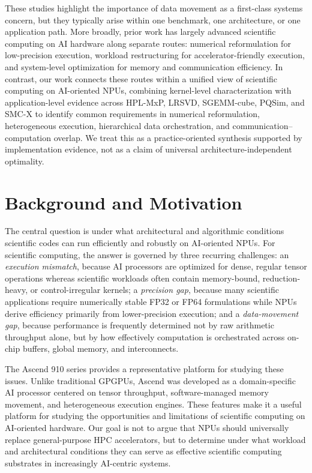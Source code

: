 \documentclass{article}
\newcommand{\rev}[1]{#1}
\begin{document}
These studies highlight the importance of data movement as a first-class systems concern, but they typically arise within one benchmark, one architecture, or one application path. More broadly, prior work has largely advanced scientific computing on AI hardware along separate routes: numerical reformulation for low-precision execution, workload restructuring for accelerator-friendly execution, and system-level optimization for memory and communication efficiency. In contrast, our work connects these routes within a unified view of scientific computing on AI-oriented NPUs, combining kernel-level characterization with application-level evidence across HPL-MxP, LRSVD, SGEMM-cube, PQSim, and SMC-X to identify common requirements in numerical reformulation, heterogeneous execution, hierarchical data orchestration, and communication--computation overlap. \rev{We treat this as a practice-oriented synthesis supported by implementation evidence, not as a claim of universal architecture-independent optimality.}


\section{Background and Motivation}

The central question is under what architectural and algorithmic conditions scientific codes can run efficiently and robustly on AI-oriented NPUs. For scientific computing, the answer is governed by three recurring challenges: an \emph{execution mismatch}, because AI processors are optimized for dense, regular tensor operations whereas scientific workloads often contain memory-bound, reduction-heavy, or control-irregular kernels; a \emph{precision gap}, because many scientific applications require numerically stable FP32 or FP64 formulations while NPUs derive efficiency primarily from lower-precision execution; and a \emph{data-movement gap}, because performance is frequently determined not by raw arithmetic throughput alone, but by how effectively computation is orchestrated across on-chip buffers, global memory, and interconnects.

The Ascend 910 series provides a representative platform for studying these issues. Unlike traditional GPGPUs, Ascend was developed as a domain-specific AI processor centered on tensor throughput, software-managed memory movement, and heterogeneous execution engines. These features make it a useful platform for studying the opportunities and limitations of scientific computing on AI-oriented hardware. Our goal is not to argue that NPUs should universally replace general-purpose HPC accelerators, but to determine under what workload and architectural conditions they can serve as effective scientific computing substrates in increasingly AI-centric systems.
\end{document}
